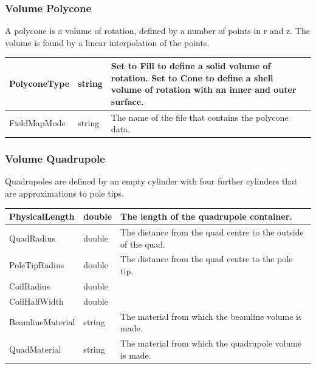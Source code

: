 \subsubsection{Volume Polycone}
A polycone is a volume of rotation, defined by a number of points in r and z. The volume is found by a linear
interpolation of the points.

\begin{center}
\tabletail{}
\tablelasttail{}
\begin{supertabular}{|m{3.665cm}|m{1.278cm}|m{12.052cm}|}
\hline
PolyconeType &
string &
Set to Fill to define a solid volume of rotation. Set to Cone to define a shell volume of rotation with an inner and
outer surface.\\\hline
FieldMapMode &
string &
The name of the file that contains the polycone data.\\\hline
\end{supertabular}
\end{center}
\subsubsection{Volume Quadrupole}
Quadrupoles are defined by an empty cylinder with four further cylinders that are approximations to pole tips.

\begin{center}
\tabletail{}
\tablelasttail{}
\begin{supertabular}{|m{3.665cm}|m{1.278cm}|m{12.052cm}|}
\hline
PhysicalLength &
double &
The length of the quadrupole container.\\\hline
QuadRadius &
double &
The distance from the quad centre to the outside of the quad.\\\hline
PoleTipRadius &
double &
The distance from the quad centre to the pole tip.\\\hline
CoilRadius &
double &
~
\\\hline
CoilHalfWidth &
double &
~
\\\hline
BeamlineMaterial &
string &
The material from which the beamline volume is made.\\\hline
QuadMaterial &
string &
The material from which the quadrupole volume is made.\\\hline
\end{supertabular}
\end{center}
